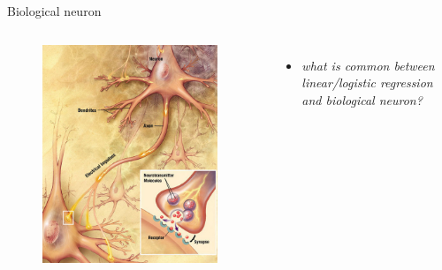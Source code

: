 \documentclass{beamer}
\begin{document}
\begin{frame}{Biological neuron}

\begin{columns}[t]

\begin{figure}[h!]
  \centering
  \includegraphics[width=0.95\textwidth]{images/bneuron.jpg}
\end{figure}
	

\begin{itemize}
\item \textit{what is common between linear/logistic regression and biological neuron?}
\end{itemize}
	
\end{columns}

\end{frame}
\end{document}
